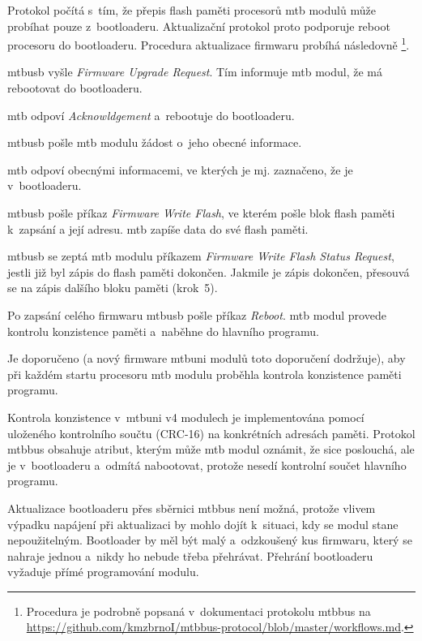 Protokol počítá s~tím, že přepis flash paměti procesorů \gls{mtb} modulů může
probíhat pouze z~bootloaderu. Aktualizační protokol proto podporuje reboot
procesoru do bootloaderu. Procedura aktualizace firmwaru probíhá následovně
\footnote{Procedura je podrobně popsaná v~dokumentaci protokolu
\gls{mtbbus} na \\
\url{https://github.com/kmzbrnoI/mtbbus-protocol/blob/master/workflows.md}.}.

\begin{compactenum}
\item \gls{mtbusb} vyšle \textit{Firmware Upgrade Request}. Tím informuje \gls{mtb}
	modul, že má rebootovat do bootloaderu.
\item \gls{mtb} odpoví \textit{Acknowldgement} a~rebootuje do bootloaderu.
\item \gls{mtbusb} pošle \gls{mtb} modulu žádost o~jeho obecné informace.
\item \gls{mtb} odpoví obecnými informacemi, ve kterých je mj. zaznačeno,
	že je v~bootloaderu.
\item \gls{mtbusb} pošle příkaz \textit{Firmware Write Flash}, ve kterém pošle
	blok flash paměti k~zapsání a její adresu. \gls{mtb} zapíše data do své flash
	paměti.
\item \gls{mtbusb} se zeptá \gls{mtb} modulu příkazem \textit{Firmware Write
	Flash Status Request}, jestli již byl zápis do flash paměti dokončen.
	Jakmile je zápis dokončen, přesouvá se na zápis dalšího bloku paměti (krok~5).
\item Po zapsání celého firmwaru \gls{mtbusb} pošle příkaz \textit{Reboot}.
	\gls{mtb} modul provede kontrolu konzistence paměti a~naběhne do hlavního
	programu.
\end{compactenum}

Je doporučeno (a nový firmware \gls{mtbuni} modulů toto doporučení dodržuje),
aby při každém startu procesoru \gls{mtb} modulu proběhla kontrola konzistence
paměti programu.

Kontrola konzistence v~\gls{mtbuni} v4 modulech je implementována pomocí
uloženého kontrolního součtu (CRC-16) na konkrétních adresách paměti.
Protokol \gls{mtbbus} obsahuje atribut, kterým může \gls{mtb} modul oznámit, že
sice poslouchá, ale je v~bootloaderu a~odmítá nabootovat, protože nesedí
kontrolní součet hlavního programu.

Aktualizace bootloaderu přes sběrnici \gls{mtbbus} není možná, protože vlivem
výpadku napájení při aktualizaci by mohlo dojít k~situaci, kdy se modul stane
nepoužitelným. Bootloader by měl být malý a~odzkoušený kus firmwaru, který se
nahraje jednou a~nikdy ho nebude třeba přehrávat. Přehrání bootloaderu vyžaduje
přímé programování modulu.

